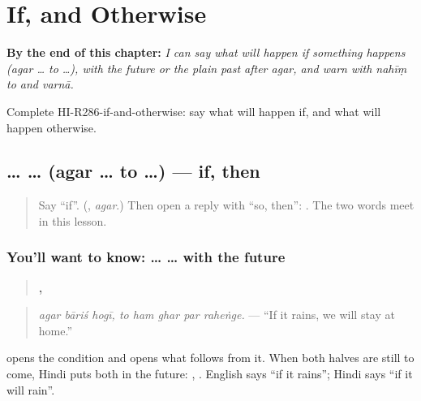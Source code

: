 
\chapter{If, and Otherwise}
\label{ch:hi-if-and-otherwise}

\begin{chapteropening}
\textbf{By the end of this chapter:} \emph{I can say what will happen if something happens (agar … to …), with the future or the plain past after agar, and warn with nahīṃ to and varnā.}

Complete HI-R286-if-and-otherwise: say what will happen if, and what will happen otherwise.
\end{chapteropening}

\section[\texorpdfstring{\hi{अगर} … \hi{तो} … (agar … to …)}{अगर … तो … (agar … to …)}]{ …  … (agar … to …) — if, then}

\label{lesson:HI-C286-agarto}



\begin{quote}
Say \textquotedblleft{}if\textquotedblright{}. (\textbf{}, \emph{agar}.) Then open a reply with \textquotedblleft{}so, then\textquotedblright{}: \textbf{ }. The two words meet in this lesson.
\end{quote}

\subsection*{You'll want to know:  …  … with the future}
\begin{quote}
\textbf{  ,     }
\end{quote}

\begin{quote}
\emph{agar bāriś hogī, to ham ghar par raheṅge.} — \textquotedblleft{}If it rains, we will stay at home.\textquotedblright{}
\end{quote}

\textbf{} opens the condition and \textbf{} opens what follows from it. When both halves are still to come, Hindi puts both in the future: \textbf{}, \textbf{}. English says \textquotedblleft{}if it rains\textquotedblright{}; Hindi says \textquotedblleft{}if it will rain\textquotedblright{}.

